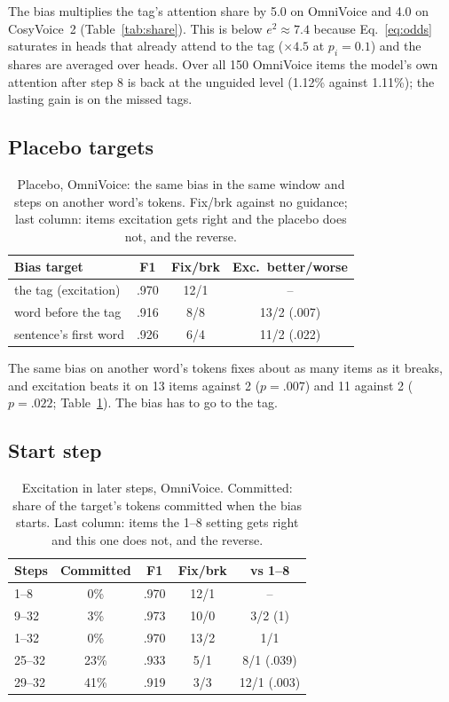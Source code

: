\documentclass[11pt]{article}
\begin{document}
The bias multiplies the tag's attention share by 5.0 on OmniVoice and 4.0 on CosyVoice~2 (Table~\ref{tab:share}). This is below $e^2 \approx 7.4$ because Eq.~\eqref{eq:odds} saturates in heads that already attend to the tag ($\times 4.5$ at $p_i = 0.1$) and the shares are averaged over heads. Over all 150 OmniVoice items the model's own attention after step 8 is back at the unguided level (1.12\% against 1.11\%); the lasting gain is on the missed tags.

\subsection{Placebo targets}

\begin{table}[t]
  \centering
  \small
  \setlength{\tabcolsep}{4pt}
  \begin{tabular}{lccc}
    \toprule
    Bias target & F1 & Fix/brk & Exc.\ better/worse \\
    \midrule
    the tag (excitation)   & .970 & 12/1 & -- \\
    word before the tag    & .916 & 8/8  & 13/2 (.007) \\
    sentence's first word  & .926 & 6/4  & 11/2 (.022) \\
    \bottomrule
  \end{tabular}
  \caption{Placebo, OmniVoice: the same bias in the same window and steps on another word's tokens. Fix/brk against no guidance; last column: items excitation gets right and the placebo does not, and the reverse.}
  \label{tab:placebo}
\end{table}

The same bias on another word's tokens fixes about as many items as it breaks, and excitation beats it on 13 items against 2 ($p = .007$) and 11 against 2 ($p = .022$; Table~\ref{tab:placebo}). The bias has to go to the tag.

\subsection{Start step}
\label{sec:steps-res}

\begin{table}[t]
  \centering
  \small
  \setlength{\tabcolsep}{4pt}
  \begin{tabular}{lcccc}
    \toprule
    Steps & Committed & F1 & Fix/brk & vs 1--8 \\
    \midrule
    1--8   & 0\%  & .970 & 12/1 & -- \\
    9--32  & 3\%  & .973 & 10/0 & 3/2 (1) \\
    1--32  & 0\%  & .970 & 13/2 & 1/1 \\
    25--32 & 23\% & .933 & 5/1  & 8/1 (.039) \\
    29--32 & 41\% & .919 & 3/3  & 12/1 (.003) \\
    \bottomrule
  \end{tabular}
  \caption{Excitation in later steps, OmniVoice. Committed: share of the target's tokens committed when the bias starts. Last column: items the 1--8 setting gets right and this one does not, and the reverse.}
  \label{tab:steps}
\end{table}
\end{document}
